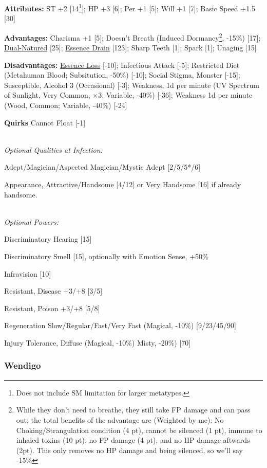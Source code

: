 \begin{multicols*}{3}
	\textbf{Attributes:}
	ST +2 [14\footnote{Does not include SM limitation for larger metatypes.}]; HP +3 [6]; Per +1 [5]; Will +1 [7]; Basic Speed +1.5 [30]
	
	\textbf{Advantages:}
	Charisma +1 [5]; Doesn't Breath (Induced Dormancy\footnote{While they don't need to breathe, they still take FP damage and can pass out; the total benefits of the advantage are (Weighted by me): No Choking/Strangulation condition (4 pt), cannot be silenced (1 pt), immune to inhaled toxins (10 pt), no FP damage (4 pt), and no HP damage aftwards (2pt). This only removes no HP damage and being silenced, so we'll say -15\%}, -15\%) [17]; \hyperref[dual_natured]{Dual-Natured} [25];  \hyperref[essence_drain]{Essence Drain} [123]; Sharp Teeth [1]; Spark [1]; Unaging [15]
		
	\textbf{Disadvantages:}	
	\hyperref[essence_loss]{Essence Loss} [-10]; Infectious Attack [-5]; Restricted Diet (Metahuman Blood; Subsitution, -50\%) [-10]; Social Stigma, Monster [-15]; Susceptible, Alcohol 3 (Occasional) [-3]; Weakness, 1d per minute (UV Spectrum of Sunlight, Very Common, $\times$3; Variable, -40\%) [-36]; Weakness 1d per minute (Wood, Common; Variable, -40\%) [-24]
	
	\textbf{Quirks} 
	Cannot Float [-1]
	
	\textit{\\Optional Qualities at Infection:}
	
	Adept/Magician/Aspected Magician/Mystic Adept [2/5/5*/6]
	
	Appearance, Attractive/Handsome [4/12] or Very Handsome [16] if already handsome.	
	
	\textit{\\Optional Powers:}
		
	Discriminatory Hearing [15]
	
	Discriminatory Smell [15], optionally with Emotion Sense, +50\%
	
	Infravision [10]
	
	Resistant, Disease +3/+8 [3/5]
	
	Resistant, Poison +3/+8 [5/8]
	
	Regeneration Slow/Regular/Fast/Very Fast (Magical, -10\%) [9/23/45/90]
	
	Injury Tolerance, Diffuse (Magical, -10\%) Misty, -20\%) [70]
	
	\subsubsection{Wendigo}
	

\end{multicols*}

